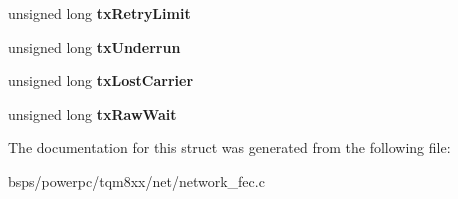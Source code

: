 \begin{DoxyCompactItemize}
unsigned long {\bfseries tx\+Retry\+Limit}
\item 
\mbox{\label{structm8xx__fec__enet__struct_a30cfcb643372bd5fc963b1a5cc3f1214}} 
unsigned long {\bfseries tx\+Underrun}
\item 
\mbox{\label{structm8xx__fec__enet__struct_a0ccc619074a5ecdf740f954fb6fb0725}} 
unsigned long {\bfseries tx\+Lost\+Carrier}
\item 
\mbox{\label{structm8xx__fec__enet__struct_a41c5d6d794d56a738f5b2b18e4c3f3f0}} 
unsigned long {\bfseries tx\+Raw\+Wait}
\end{DoxyCompactItemize}


The documentation for this struct was generated from the following file\+:\begin{DoxyCompactItemize}
\item 
bsps/powerpc/tqm8xx/net/network\+\_\+fec.\+c\end{DoxyCompactItemize}
